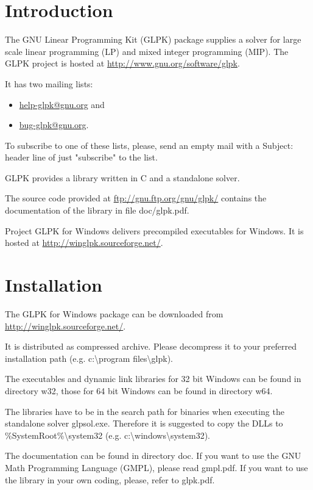 \documentclass[a4paper,11pt]{report}
\begin{document}
\chapter{Introduction}
The GNU Linear Programming Kit (GLPK) package supplies a solver for large
scale linear programming (LP) and mixed integer programming (MIP). The GLPK
project is hosted at
\href{http://www.gnu.org/software/glpk}{http://www.gnu.org/software/glpk}.

It has two mailing lists: 
\begin{itemize}
\item\href{mailto:help-glpk@gnu.org}{help-glpk@gnu.org} and 
\item\href{mailto:bug-glpk@gnu.org}{bug-glpk@gnu.org}.
\end{itemize}
To subscribe to one of these lists, please, send an empty mail with a Subject: header line of just "subscribe" to the list.

GLPK provides a library written in C and a standalone solver.

The source code provided at \href{ftp://gnu.ftp.org/gnu/glpk/}{ftp://gnu.ftp.org/gnu/glpk/} contains the documentation of the library in  file doc/glpk.pdf.

Project GLPK for Windows delivers precompiled executables for Windows. It is hosted at \href{http://winglpk.sourceforge.net/}{http://winglpk.sourceforge.net/}.

\chapter{Installation}
The GLPK for Windows package can be downloaded from \linebreak\href{http://winglpk.sourceforge.net/}{http://winglpk.sourceforge.net/}.

It is distributed as compressed archive. Please decompress it to your preferred installation path (e.g. c:\textbackslash program files\textbackslash glpk).

The executables and dynamic link libraries for 32 bit Windows can be found in directory w32, those for 64 bit Windows can be found in directory w64.

The libraries have to be in the search path for binaries when executing the standalone solver glpsol.exe. Therefore it is suggested to copy the DLLs to \%SystemRoot\%\textbackslash system32 (e.g. c:\textbackslash windows\textbackslash system32).

The documentation can be found in directory doc. If you want to use the GNU Math Programming Language (GMPL), please read gmpl.pdf. If you want to use the library in your own coding, please, refer to glpk.pdf.
\end{document}

